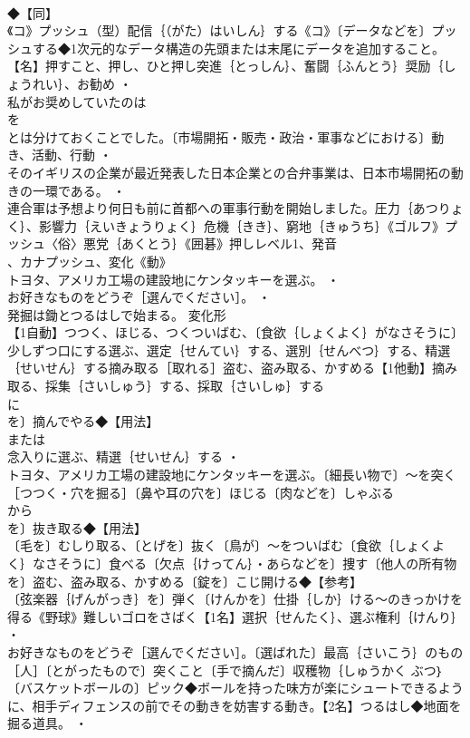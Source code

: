 \documentclass[8pt]{extreport}
\begin{document}
\begin{CJK}{UTF8}{min}
\\	◆【同】
\\	《コ》プッシュ（型）配信｛（がた）はいしん｝する《コ》〔データなどを〕プッシュする◆1次元的なデータ構造の先頭または末尾にデータを追加すること。【名】押すこと、押し、ひと押し突進｛とっしん｝、奮闘｛ふんとう｝奨励｛しょうれい｝、お勧め ・
\\	私がお奨めしていたのは
\\	を
\\	とは分けておくことでした。〔市場開拓・販売・政治・軍事などにおける〕動き、活動、行動 ・
\\	そのイギリスの企業が最近発表した日本企業との合弁事業は、日本市場開拓の動きの一環である。 ・
\\	連合軍は予想より何日も前に首都への軍事行動を開始しました。圧力｛あつりょく｝、影響力｛えいきょうりょく｝危機｛きき｝、窮地｛きゅうち｝《ゴルフ》プッシュ〈俗〉悪党｛あくとう｝《囲碁》押しレベル1、発音
\\	、カナプッシュ、変化《動》
\\	トヨタ、アメリカ工場の建設地にケンタッキーを選ぶ。 ・
\\	お好きなものをどうぞ［選んでください］。 ・
\\	発掘は鋤とつるはしで始まる。	変化形 
\\	【1自動】つつく、ほじる、つくついばむ、〔食欲｛しょくよく｝がなさそうに〕少しずつ口にする選ぶ、選定｛せんてい｝する、選別｛せんべつ｝する、精選｛せいせん｝する摘み取る［取れる］盗む、盗み取る、かすめる【1他動】摘み取る、採集｛さいしゅう｝する、採取｛さいしゅ｝する
\\	に
\\	を〕摘んでやる◆【用法】
\\	または
\\	念入りに選ぶ、精選｛せいせん｝する ・
\\	トヨタ、アメリカ工場の建設地にケンタッキーを選ぶ。〔細長い物で〕～を突く［つつく・穴を掘る］〔鼻や耳の穴を〕ほじる〔肉などを〕しゃぶる
\\	から
\\	を〕抜き取る◆【用法】
\\	〔毛を〕むしり取る、〔とげを〕抜く〔鳥が〕～をついばむ〔食欲｛しょくよく｝なさそうに〕食べる〔欠点｛けってん｝・あらなどを〕捜す〔他人の所有物を〕盗む、盗み取る、かすめる〔錠を〕こじ開ける◆【参考】
\\	〔弦楽器｛げんがっき｝を〕弾く〔けんかを〕仕掛｛しか｝ける～のきっかけを得る《野球》難しいゴロをさばく【1名】選択｛せんたく｝、選ぶ権利｛けんり｝ ・
\\	お好きなものをどうぞ［選んでください］。〔選ばれた〕最高｛さいこう｝のもの［人］〔とがったもので〕突くこと〔手で摘んだ〕収穫物｛しゅうかく ぶつ｝〔バスケットボールの〕ピック◆ボールを持った味方が楽にシュートできるように、相手ディフェンスの前でその動きを妨害する動き。【2名】つるはし◆地面を掘る道具。 ・

\end{CJK}
\end{document}
